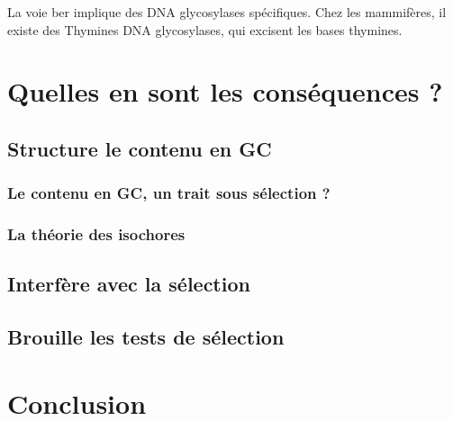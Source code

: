 \documentclass[11pt, oneside]{scrartcl}
\begin{document}
La voie \ac{ber} implique des DNA glycosylases spécifiques. Chez les mammifères,
il existe des Thymines DNA glycosylases, qui excisent les bases thymines. 
\section{Quelles en sont les conséquences ?}
\label{sec:orgheadline17}
\subsection{Structure le contenu en GC}
\label{sec:orgheadline14}
\subsubsection{Le contenu en GC, un trait sous sélection ?}
\label{sec:orgheadline12}
\subsubsection{La théorie des isochores}
\label{sec:orgheadline13}
\subsection{Interfère avec la sélection}
\label{sec:orgheadline15}
\subsection{Brouille les tests de sélection}
\label{sec:orgheadline16}
\section*{Conclusion}
\label{sec:orgheadline18}

\end{document}
